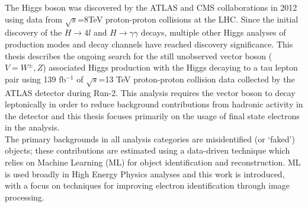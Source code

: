 
The Higgs boson was discovered by the ATLAS and CMS collaborations in 2012 using data from $\sqrt{s}$=8TeV proton-proton collisions at the LHC. Since the initial discovery of the $H\rightarrow 4l$ and $H\rightarrow \gamma\gamma$ decays, multiple other Higgs analyses of production modes and decay channels have reached discovery significance. This thesis describes the ongoing search for the still unobserved vector boson ($V=W^{\pm},Z$) associated Higgs production with the Higgs decaying to a tau lepton pair using 139 fb$^{-1}$ of $\sqrt{s}$=13 TeV proton-proton collision data collected by the ATLAS detector during Run-2. This analysis requires the vector boson to decay leptonically in order to reduce background contributions from hadronic activity in the detector and this thesis focuses primarily on the usage of final state electrons in the analysis.\\
\vspace{.1in}
The primary backgrounds in all analysis categories are misidentified (or `faked') objects; these contributions are estimated using a data-driven technique which relies on Machine Learning (ML) for object identification and reconstruction. ML is used broadly in High Energy Physics analyses and this work is introduced, with a focus on techniques for improving electron identification through image processing.